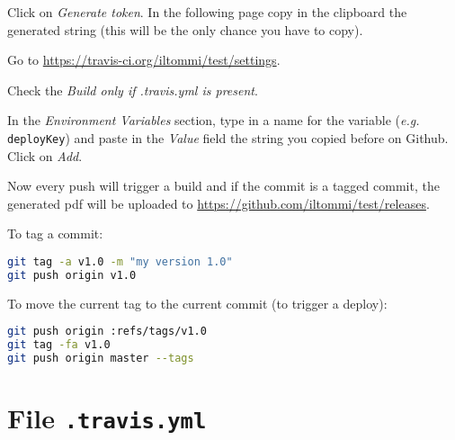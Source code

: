 \documentclass[12pt]{article}
\begin{document}
Click on \emph{Generate token}. In the following page copy in the clipboard the generated string (this will be the only chance you have to copy).

Go to \url{https://travis-ci.org/iltommi/test/settings}. 

Check the \emph{Build only if .travis.yml is present}.

In the \emph{Environment Variables} section, type in a name for the variable (\emph{e.g.} \texttt{deployKey}) and paste in the \emph{Value} field the string you copied before on Github. Click on \emph{Add}.

Now every push will trigger a build and if the commit is a tagged commit, the generated pdf will be uploaded to \url{https://github.com/iltommi/test/releases}.

To tag a commit:
\begin{lstlisting}[language=Bash] 
git tag -a v1.0 -m "my version 1.0"
git push origin v1.0
\end{lstlisting}

To move the current tag to the current commit (to trigger a deploy):
\begin{lstlisting}[language=Bash] 
git push origin :refs/tags/v1.0
git tag -fa v1.0
git push origin master --tags
\end{lstlisting}

\section*{File \texttt{.travis.yml}}


\end{document}
